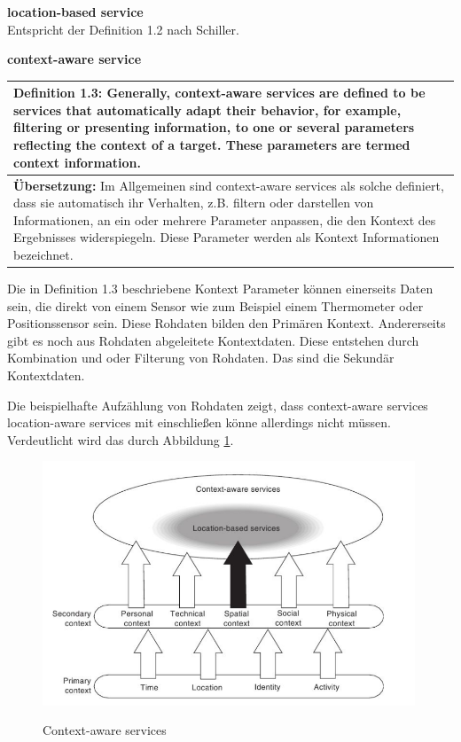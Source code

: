 \textbf{location-based service} \\
Entspricht der Definition 1.2 nach Schiller.


\textbf{context-aware service} \\
\begin{table}[h]
	\centering
	\begin{tabular}{|p{16cm}|}\hline
		\textbf{Definition 1.3:} \glqq Generally, context-aware services are defined to be services that automatically adapt their behavior, for example, filtering or presenting information, to one or several parameters reflecting the context of a target. These parameters are termed context information.\grqq \cite[S.2]{Kuepper2005}\\ \hline
		\textbf{Übersetzung:} Im Allgemeinen sind context-aware services als solche definiert, dass sie automatisch ihr Verhalten, z.B. filtern oder darstellen von Informationen, an ein oder mehrere Parameter anpassen, die den Kontext des Ergebnisses widerspiegeln. Diese Parameter werden als Kontext Informationen bezeichnet. \\ \hline
	\end{tabular}
\end{table}

Die in Definition 1.3 beschriebene Kontext Parameter können einerseits Daten sein, die direkt von einem Sensor wie zum Beispiel einem Thermometer oder Positionssensor sein. Diese Rohdaten bilden den Primären Kontext. Andererseits gibt es noch aus Rohdaten abgeleitete Kontextdaten. Diese entstehen durch Kombination und oder Filterung von Rohdaten. Das sind die Sekundär Kontextdaten. 
\cite[S.2]{Kuepper2005}

Die beispielhafte Aufzählung von Rohdaten zeigt, dass context-aware services location-aware services mit einschließen könne allerdings nicht müssen. Verdeutlicht wird das durch Abbildung \ref{fig:context-aware services}.


\begin{figure}[h]
\centering
\includegraphics[width=0.99\textwidth]{ref/images/definitionK.png}
\caption[Context-aware services]{Context-aware services}
\label{fig:context-aware services}
\cite[S. 2]{Kuepper2005}
\end{figure}

